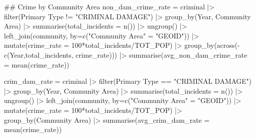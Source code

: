 \documentclass[
]{report}
\newenvironment{Shaded}{}{}
\newcommand{\AttributeTok}[1]{\textcolor[rgb]{0.84,0.23,0.29}{#1}}
\newcommand{\DecValTok}[1]{\textcolor[rgb]{0.00,0.36,0.77}{#1}}
\newcommand{\DocumentationTok}[1]{\textcolor[rgb]{0.42,0.45,0.49}{#1}}
\newcommand{\FunctionTok}[1]{\textcolor[rgb]{0.44,0.26,0.76}{#1}}
\newcommand{\NormalTok}[1]{\textcolor[rgb]{0.14,0.16,0.18}{#1}}
\newcommand{\OtherTok}[1]{\textcolor[rgb]{0.44,0.26,0.76}{#1}}
\newcommand{\SpecialCharTok}[1]{\textcolor[rgb]{0.00,0.36,0.77}{#1}}
\newcommand{\StringTok}[1]{\textcolor[rgb]{0.01,0.18,0.38}{#1}}
\begin{document}
\begin{Shaded}
\begin{Highlighting}[]
\DocumentationTok{\#\# Crime by Community Area}
\NormalTok{non\_dam\_crime\_rate }\OtherTok{=}\NormalTok{ criminal }\SpecialCharTok{|\textgreater{}} 
  \FunctionTok{filter}\NormalTok{(}\StringTok{\textasciigrave{}}\AttributeTok{Primary Type}\StringTok{\textasciigrave{}} \SpecialCharTok{!=} \StringTok{"CRIMINAL DAMAGE"}\NormalTok{) }\SpecialCharTok{|\textgreater{}} 
  \FunctionTok{group\_by}\NormalTok{(Year, }\StringTok{\textasciigrave{}}\AttributeTok{Community Area}\StringTok{\textasciigrave{}}\NormalTok{) }\SpecialCharTok{|\textgreater{}} 
  \FunctionTok{summarise}\NormalTok{(}\AttributeTok{total\_incidents =} \FunctionTok{n}\NormalTok{()) }\SpecialCharTok{|\textgreater{}} 
  \FunctionTok{ungroup}\NormalTok{() }\SpecialCharTok{|\textgreater{}} 
  \FunctionTok{left\_join}\NormalTok{(community, }\AttributeTok{by=}\FunctionTok{c}\NormalTok{(}\StringTok{"Community Area"} \OtherTok{=} \StringTok{"GEOID"}\NormalTok{)) }\SpecialCharTok{|\textgreater{}} 
  \FunctionTok{mutate}\NormalTok{(}\AttributeTok{crime\_rate =} \DecValTok{100}\SpecialCharTok{*}\NormalTok{total\_incidents}\SpecialCharTok{/}\NormalTok{TOT\_POP) }\SpecialCharTok{|\textgreater{}} 
  \FunctionTok{group\_by}\NormalTok{(}\FunctionTok{across}\NormalTok{(}\SpecialCharTok{{-}}\FunctionTok{c}\NormalTok{(Year,total\_incidents, crime\_rate))) }\SpecialCharTok{|\textgreater{}} 
  \FunctionTok{summarise}\NormalTok{(}\AttributeTok{avg\_non\_dam\_crime\_rate =} \FunctionTok{mean}\NormalTok{(crime\_rate))}

\NormalTok{crim\_dam\_rate }\OtherTok{=}\NormalTok{ criminal }\SpecialCharTok{|\textgreater{}} 
  \FunctionTok{filter}\NormalTok{(}\StringTok{\textasciigrave{}}\AttributeTok{Primary Type}\StringTok{\textasciigrave{}} \SpecialCharTok{==} \StringTok{"CRIMINAL DAMAGE"}\NormalTok{) }\SpecialCharTok{|\textgreater{}} 
  \FunctionTok{group\_by}\NormalTok{(Year, }\StringTok{\textasciigrave{}}\AttributeTok{Community Area}\StringTok{\textasciigrave{}}\NormalTok{) }\SpecialCharTok{|\textgreater{}} 
  \FunctionTok{summarise}\NormalTok{(}\AttributeTok{total\_incidents =} \FunctionTok{n}\NormalTok{()) }\SpecialCharTok{|\textgreater{}} 
  \FunctionTok{ungroup}\NormalTok{() }\SpecialCharTok{|\textgreater{}} 
  \FunctionTok{left\_join}\NormalTok{(community, }\AttributeTok{by=}\FunctionTok{c}\NormalTok{(}\StringTok{"Community Area"} \OtherTok{=} \StringTok{"GEOID"}\NormalTok{)) }\SpecialCharTok{|\textgreater{}} 
  \FunctionTok{mutate}\NormalTok{(}\AttributeTok{crime\_rate =} \DecValTok{100}\SpecialCharTok{*}\NormalTok{total\_incidents}\SpecialCharTok{/}\NormalTok{TOT\_POP) }\SpecialCharTok{|\textgreater{}} 
  \FunctionTok{group\_by}\NormalTok{(}\StringTok{\textasciigrave{}}\AttributeTok{Community Area}\StringTok{\textasciigrave{}}\NormalTok{) }\SpecialCharTok{|\textgreater{}} 
  \FunctionTok{summarise}\NormalTok{(}\AttributeTok{avg\_crim\_dam\_rate =} \FunctionTok{mean}\NormalTok{(crime\_rate))}
  

\end{Highlighting}
\end{Shaded}
\end{document}
